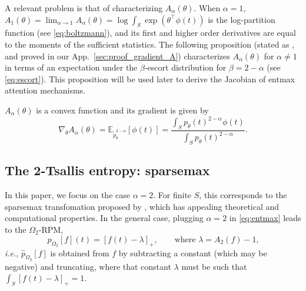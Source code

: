 \documentclass{article}
\newcommand{\remove}[1]{}
\begin{document}
A relevant problem is that of characterizing $A_\alpha(\theta)$. When $\alpha=1$, 
$A_1(\theta) = {\lim_{\alpha\rightarrow 1}} A_\alpha(\theta) = \log \int_S \exp(\theta^\top \phi(t))$ is the log-partition function (see \eqref{eq:boltzmann}), and  its first and higher order derivatives are equal to the moments of the sufficient statistics. The following proposition (stated as \citet[Theorem~5]{amari2011geometry}, and proved in our App.~\ref{sec:proof_gradient_A}) 
characterizes $A_\alpha(\theta)$ for $\alpha \ne 1$ in terms of an expectation under the $\beta$-escort distribution for $\beta = 2-\alpha$ (see \eqref{eq:escort}). This proposition will be used later to derive the Jacobian of entmax attention mechanisms. \remove{and the gradient and Hessian of Fenchel-Young losses.}


\vspace{0.3cm}

\begin{proposition}\label{prop:gradient_A}
$A_\alpha(\theta)$ is a convex function and its gradient is given by
\begin{equation}\label{eq:derivative_of_partition}
    \nabla_\theta A_\alpha(\theta) = \mathbb{E}_{\tilde{p}_\theta^{2-\alpha}}[\phi(t)] = \frac{\int_{S} p_\theta(t)^{2-\alpha} \phi(t)}{\int_{S} p_\theta(t)^{2-\alpha}}.
\end{equation}
\end{proposition}







\subsection{The 2-Tsallis entropy: sparsemax}\label{sec:sparsemax}

In this paper, we focus on the case $\alpha=2$. For finite $S$, this corresponds to the sparsemax transfomation proposed by \citet{Martins2016ICML}, 
which has appealing  theoretical and computational properties. 
In the general case, 
plugging $\alpha=2$ in \eqref{eq:entmax} leads to the $\Omega_2$-RPM,
\begin{equation}\label{eq:sparsemax}
\hat{p}_{\Omega_2}[f](t) = [f(t) - \lambda]_+, 
\qquad \text{where $\lambda = A_2(f) - 1$,}
\end{equation}
\textit{i.e.}, $\hat{p}_{\Omega_2}[f]$ is obtained from $f$ by subtracting a constant (which may be negative) and truncating, where that constant $\lambda$ must be such that $ \int_S [f(t) - \lambda]_+ = 1$. 
\remove{For the discrete case, this constant has been called the \textit{threshold function} by \citet{Martins2016ICML}.}
\end{document}
